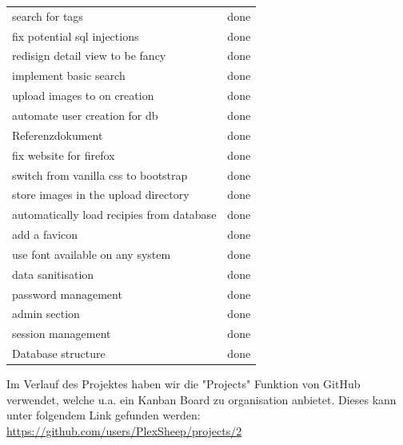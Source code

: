 \documentclass{article}
\begin{document}
\begin{center}
\begin{table}[]
\begin{tabular}{@{}|l|l|@{}}
search for tags                                                         & done      \\ 
fix potential sql injections                                            & done      \\ 
redisign detail view to be fancy                                        & done      \\ 
implement basic search                                                  & done      \\ 
upload images to on creation                                            & done      \\ 
automate user creation for db                                           & done      \\ 
Referenzdokument                                                        & done      \\ 
fix website for firefox                                                 & done      \\ 
switch from vanilla css to bootstrap                                    & done      \\ 
store images in the upload directory                                    & done      \\ 
automatically load recipies from database                               & done      \\ 
add a favicon                                                           & done      \\ 
use font available on any system                                        & done      \\ 
data sanitisation                                                       & done      \\ 
password management                                                     & done      \\ 
admin section                                                           & done      \\ 
session management                                                      & done      \\ 
Database structure                                                      & done      \\ 
\hline
\end{tabular}
\end{table}

Im Verlauf des Projektes haben wir die "Projects" Funktion von GitHub verwendet, welche u.a. ein Kanban Board zu organisation anbietet.
Dieses kann unter folgendem Link gefunden werden:  
\url{https://github.com/users/PlexSheep/projects/2}
\end{center}
\end{document}
